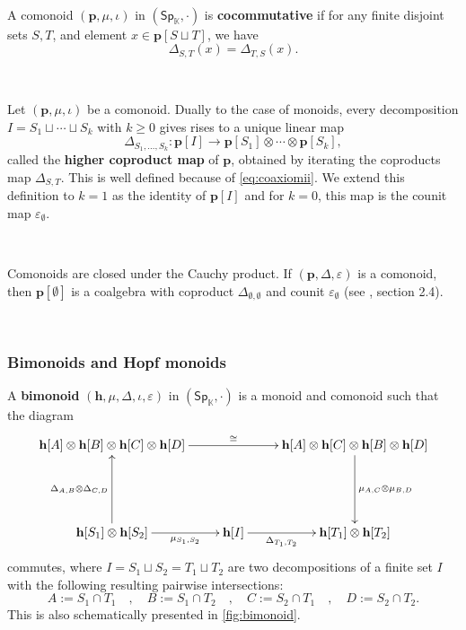 \documentclass[12pt, reqno]{amsart}
\theoremstyle{definition}
\newcommand{\Ssk}{\mathsf{Sp}_\Kb} %
\newcommand{\Kb}{\mathbb{K}}
\newcommand{\thh}{\mathbf{h}}
\newcommand{\tp}{\mathbf{p}}
\begin{document}
\

A comonoid $(\tp, \mu, \iota)$ in $(\Ssk, \cdot)$ is {\bf cocommutative} if for any finite disjoint sets $S, T$, and element $x\in \tp[S\sqcup T]$, we have
\begin{equation*}
    \Delta_{S,T}(x)=\Delta_{T,S}(x).
\end{equation*}

\

Let $(\tp, \mu, \iota)$ be a comonoid. Dually to the case of monoids, every decomposition $I=S_1 \sqcup \cdots \sqcup S_k$ with $k \geq 0$ gives rises to a unique linear map
\begin{equation}
    \Delta_{S_1, \hdots, S_k}: \tp[I] \to \tp[S_1]\otimes \cdots \otimes \tp[S_k],
\end{equation}
called the {\bf higher coproduct map} of $\tp$, obtained by iterating the coproducts map $\Delta_{S,T}$. 
This is well defined because of \cref{eq:coaxiomii}.
We extend this definition to $k=1$ as the identity of $\tp[I]$ and for $k=0$, this map is the counit map $\varepsilon_\emptyset$.

\

Comonoids are closed under the Cauchy product. 
If $(\tp, \Delta, \varepsilon)$ is a comonoid, then $\tp[\emptyset]$ is a coalgebra with coproduct $\Delta_{\emptyset, \emptyset}$ and counit $\varepsilon_\emptyset$ (see \cite{AM2013}, section 2.4).

\

\subsubsection{Bimonoids  and Hopf monoids}
A {\bf bimonoid} $(\thh, \mu, \Delta, \iota, \varepsilon)$ in $(\Ssk, \cdot)$ is a monoid and comonoid such that the diagram
\[\xymatrix{
\thh[A] \otimes \thh[B] \otimes \thh[C] \otimes \thh[D] \ar[rr]^-{\cong} && \thh[A] \otimes \thh[C] \otimes \thh[B] \otimes \thh[D] \ar[dd]^-{\mu_{A,C}\otimes\mu_{B,D}}\\
&&\\
\thh[S_1]\otimes \thh[S_2]\ar[uu]^-{\Delta_{A,B}\otimes \Delta_{C,D}} \ar[r]_-{\mu_{S_1, S_2}} & \thh[I] \ar[r]_-{\Delta_{T_1, T_2}} & \thh[T_1]\otimes \thh[T_2]
}\]
commutes, where $I=S_1\sqcup S_2=T_1 \sqcup T_2$ are two decompositions of a finite set $I$ with the following resulting pairwise intersections:
\[A:=S_1\cap T_1 \quad , \quad B:=S_1 \cap T_2 \quad , \quad C:=S_2 \cap T_1 \quad , \quad D:=S_2 \cap T_2.\]
This is also schematically presented in \cref{fig:bimonoid}.
\end{document}
